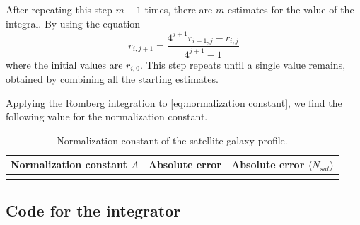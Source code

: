 \documentclass{article}
\newcommand{\CodeDir}{Code}
\newcommand{\CalcDir}{Calculations}
\begin{document}
After repeating this step $m-1$ times, there are $m$ estimates for the value of the integral. By using the equation 
\begin{equation}
    r_{i,j+1}=\frac{4^{j+1}{r_{i+1, j}-r_{i,j}}}{4^{j+1}-1}
\end{equation}
where the initial values are $r_{i,0}$. This step repeats until a single value remains, obtained by combining all the starting estimates. 

Applying the Romberg integration to \autoref{eq:normalization constant}, we find the following value for the normalization constant.
\begin{table}[H]
\centering
\caption{Normalization constant of the satellite galaxy profile.}
\begin{tabular}{|c|c|c|}
\hline
Normalization constant \(A\) & Absolute error & Absolute error $\langle N_{sat}\rangle$ \\
\hline
 \\
\hline
\end{tabular}
\end{table}

\subsection{Code for the integrator}


\end{document}
